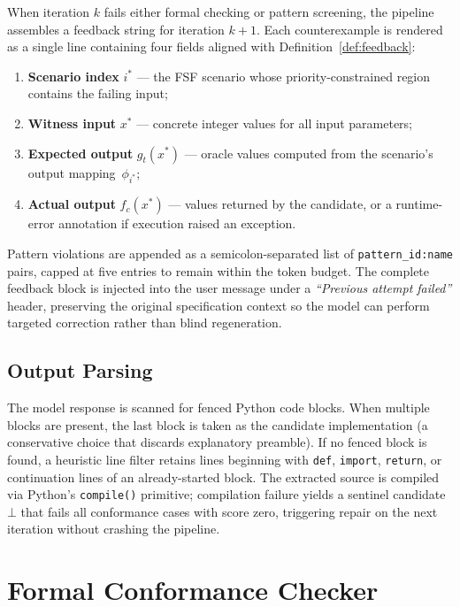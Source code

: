 When iteration $k$ fails either formal checking or pattern screening, the
pipeline assembles a feedback string for iteration $k{+}1$.  Each
counterexample is rendered as a single line containing four fields aligned
with Definition~\ref{def:feedback}:
\begin{enumerate}
  \item \textbf{Scenario index} $i^*$ --- the FSF scenario whose
        priority-constrained region contains the failing input;
  \item \textbf{Witness input} $x^*$ --- concrete integer values for all
        input parameters;
  \item \textbf{Expected output} $g_t(x^*)$ --- oracle values computed from
        the scenario's output mapping~$\phi_{i^*}$;
  \item \textbf{Actual output} $f_c(x^*)$ --- values returned by the
        candidate, or a runtime-error annotation if execution raised an
        exception.
\end{enumerate}

Pattern violations are appended as a semicolon-separated list of
\texttt{pattern\_id:name} pairs, capped at five entries to remain within
the token budget.  The complete feedback block is injected into the user
message under a \emph{``Previous attempt failed''} header, preserving the
original specification context so the model can perform targeted correction
rather than blind regeneration.

\subsection{Output Parsing}

The model response is scanned for fenced Python code blocks.  When multiple
blocks are present, the last block is taken as the candidate implementation
(a conservative choice that discards explanatory preamble).  If no fenced
block is found, a heuristic line filter retains lines beginning with
\texttt{def}, \texttt{import}, \texttt{return}, or continuation lines of an
already-started block.  The extracted source is compiled via Python's
\texttt{compile()} primitive; compilation failure yields a sentinel
candidate~$\bot$ that fails all conformance cases with score zero, triggering
repair on the next iteration without crashing the pipeline.

\section{Formal Conformance Checker}
\label{sec:impl:checker}

